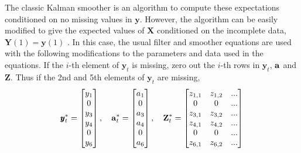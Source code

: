 \documentclass[]{article}
\def\ZZ{\mbox{$\mathbf Z$}}	\def\zz{\mbox{$\mathbf z$}}
\def\XX{\mbox{$\pmb{X}$}}	\def\xx{\mbox{$\pmb{x}$}}
\def\YY{\mbox{$\pmb{Y}$}}	\def\yy{\mbox{$\pmb{y}$}}
\begin{document}
The classic Kalman smoother is an algorithm to compute these expectations conditioned on no missing values in $\yy$. However, the algorithm  can be easily modified to give the expected values of $\XX$ conditioned on the incomplete data, $\YY(1)=\yy(1)$ \citep[section 6.4, eqn 6.78, p. 348]{ShumwayStoffer2006}.  
In this case, the usual filter and smoother equations are used with the following modifications to the parameters and data used in the equations.  If the $i$-th element of $\yy_t$ is missing, zero out the $i$-th rows in $\yy_t$, $\aa$ and $\ZZ$.  Thus if the 2nd and 5th elements of $\yy_t$ are missing,
\begin{equation}\label{eq:yaZ.miss}
\yy_t^*=\begin{bmatrix}
y_1\\
0\\
y_3\\
y_4\\
0\\
y_6\\
\end{bmatrix}, \quad
\aa_t^*=\begin{bmatrix}
a_1\\
0\\
a_3\\
a_4\\
0\\
a_6\\
\end{bmatrix}, \quad
\ZZ_t^*=\begin{bmatrix}
z_{1,1}&z_{1,2}&...\\
0&0&...\\
z_{3,1}&z_{3,2}&...\\
z_{4,1}&z_{4,2}&...\\
0&0&...\\
z_{6,1}&z_{6,2}&...\\
\end{bmatrix}
\end{equation}
\end{document}
